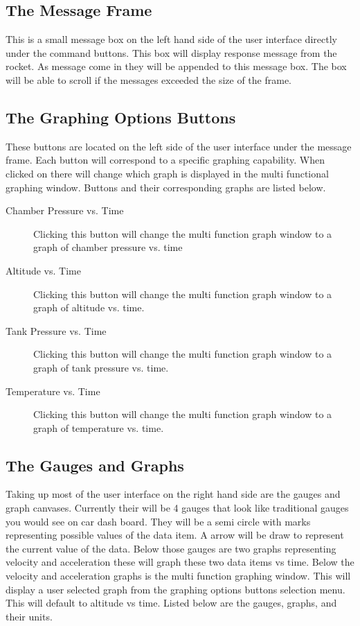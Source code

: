 \documentclass[10pt,draftclsnofoot,onecolumn,compsoc]{IEEEtran}
\begin{document}
\subsection{The Message Frame}
This is a small message box on the left hand side of the user interface directly under the command buttons. This box will display response message from the rocket. As message come in they will be appended to this message box. The box will be able to scroll if the messages exceeded the size of the frame.\par

\subsection{The Graphing Options Buttons}
These buttons are located on the left side of the user interface under the message frame. Each button will correspond to a specific graphing capability. When clicked on there will change which graph is displayed in the multi functional graphing window. Buttons and their corresponding graphs are listed below. \par

\begin{description}
\item[Chamber Pressure vs. Time] Clicking this button will change the multi function graph window to a graph of chamber pressure vs. time
\item[Altitude vs. Time] Clicking this button will change the multi function graph window to a graph of altitude vs. time.
\item[Tank Pressure vs. Time] Clicking this button will change the multi function graph window to a graph of tank pressure vs. time.
\item[Temperature vs. Time] Clicking this button will change the multi function graph window to a graph of temperature vs. time.

\end{description}

\subsection{The Gauges and Graphs}
Taking up most of the user interface on the right hand side are the gauges and graph canvases. Currently their will be 4 gauges that look like traditional gauges you would see on car dash board. They will be a semi circle with marks representing possible values of the data item. A arrow will be draw to represent the current value of the data. Below those gauges are two graphs representing velocity and acceleration these will graph these two data items vs time. Below the velocity and acceleration graphs is the multi function graphing window. This will display a user selected graph from the graphing options buttons selection menu. This will default to altitude vs time. Listed below are the gauges, graphs, and their units.
\end{document}
